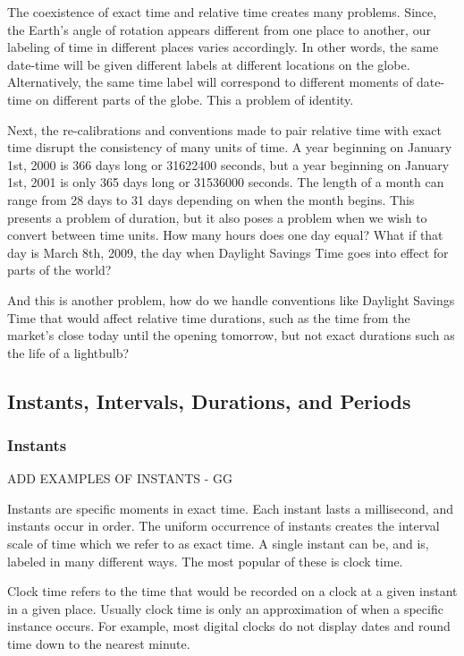 \documentclass[article]{jss}
\begin{document}
The coexistence of exact time and relative time creates many problems. Since, the Earth's angle of rotation appears different from one place to another, our labeling of time in different places varies accordingly. In other words, the same date-time will be given different labels at different locations on the globe. Alternatively, the same time label will correspond to different moments of date-time on different parts of the globe.  This a problem of identity.

Next, the re-calibrations and conventions made to pair relative time with exact time disrupt the consistency of many units of time.  A year beginning on January 1st, 2000 is 366 days long or 31622400 seconds, but a year beginning on January 1st, 2001 is only 365 days long or 31536000 seconds.  The length of a month can range from 28 days to 31 days depending on when the month begins. This presents a problem of duration, but it also poses a problem when we wish to convert between time units. How many hours does one day equal? What if that day is March 8th, 2009, the day when Daylight Savings Time goes into effect for parts of the world?

And this is another problem, how do we handle conventions like Daylight Savings Time that would affect relative time durations, such as the time from the market's close today until the opening tomorrow, but not exact durations such as the life of a lightbulb?

\subsection{Instants, Intervals, Durations, and Periods}
\label{sec:types}

\subsubsection{Instants}

ADD EXAMPLES OF INSTANTS - GG

Instants are specific moments in exact time. Each instant lasts a millisecond, and instants occur in order. The uniform occurrence of instants creates the interval scale of time which we refer to as exact time. A single instant can be, and is, labeled in many different ways.  The most popular of these is clock time.

Clock time refers to the time that would be recorded on a clock at a given instant in a given place. Usually clock time is only an approximation of when a specific instance occurs. For example, most digital clocks do not display dates and round time down to the nearest minute.
\end{document}
